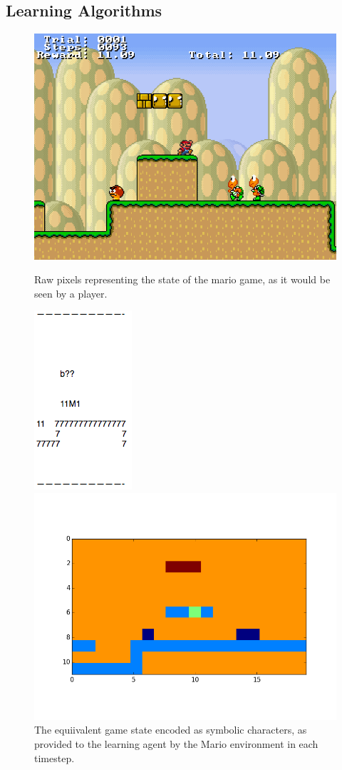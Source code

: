 \documentclass{article}
\begin{document}
\subsection{Learning Algorithms}

 \begin{figure}
 \begin{center}
\includegraphics[scale=0.35]{mario_screenshot.png}
\caption{Raw pixels representing the state of the mario game, as it would be seen by a player.}
\includegraphics[scale=0.42]{game_state.png}
\caption{The equiivalent game state encoded as symbolic characters, as provided to the learning agent by the Mario environment in each timestep.}
\includegraphics[scale=0.43]{encoded_state.png}

\end{center}
\end{figure}
\end{document}
